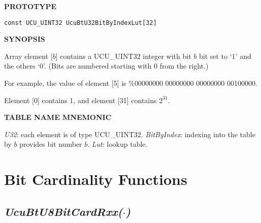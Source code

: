 %

\noindent\textbf{PROTOTYPE}
\begin {list}{}{\setlength{\leftmargin}{0.25in}\setlength{\topsep}{0.0in}}
\item
\begin{verbatim}
const UCU_UINT32 UcuBtU32BitByIndexLut[32]
\end{verbatim}
\end{list}
\vspace{2.8ex}

\noindent\textbf{SYNOPSIS}
\begin{list}{}{\setlength{\leftmargin}{0.25in}\setlength{\topsep}{0.0in}}
\item Array element [$b$] contains a UCU\_UINT32 integer with
      bit $b$ bit set to `1' and the others `0'.  (Bits are numbered starting
      with 0 from the right.)
\item For example, the value of element [5] is \%00000000 00000000 00000000 00100000.
\item Element [0] contains 1, and element [31] contains $2^{31}$.
\end{list}
\vspace{2.8ex}

\noindent\textbf{TABLE NAME MNEMONIC}
\begin{list}{}{\setlength{\leftmargin}{0.25in}\setlength{\topsep}{0.0in}}
\item \emph{U32}: each element is of type UCU\_UINT32.
      \emph{BitByIndex}: indexing into the table by $b$ provides bit number $b$.
      \emph{Lut}: lookup table.
\end{list}


\section{Bit Cardinality Functions}
\label{cbsf0:sbcf0}


\subsection[\emph{UcuBtU8BitCardRxx(\protect\mbox{\protect$\cdot$})}]
           {\emph{UcuBtU8BitCardRxx(\protect\mbox{\protect\boldmath $\cdot$})}}
\label{cbsf0:sbcf0:sbce0}

